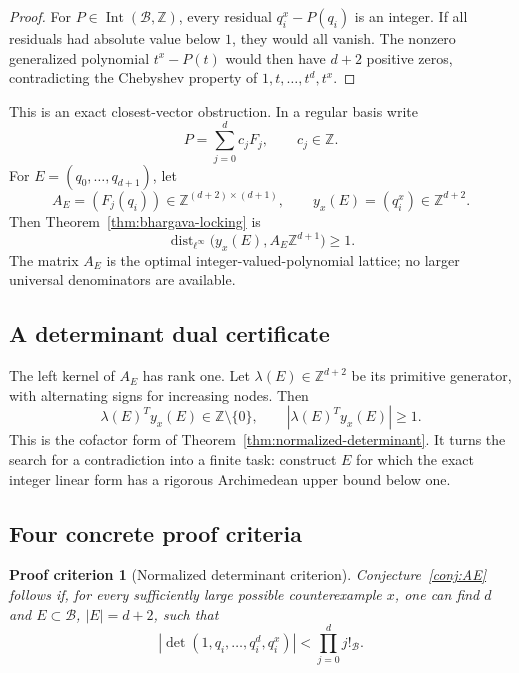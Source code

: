 \documentclass[11pt,oneside]{article}
\newtheorem{criterion}[theorem]{Proof criterion}
\theoremstyle{definition}
\theoremstyle{remark}
\newcommand{\Z}{\mathbb Z}
\newcommand{\B}{\mathcal B}
\newcommand{\Int}{\operatorname{Int}}
\newcommand{\dist}{\operatorname{dist}}
\begin{document}
\begin{proof}
For \(P\in\Int(\B,\Z)\), every residual \(q_i^x-P(q_i)\) is an integer.  If all residuals
had absolute value below \(1\), they would all vanish.  The nonzero generalized polynomial
\(t^x-P(t)\) would then have \(d+2\) positive zeros, contradicting the Chebyshev property of
\(1,t,\ldots,t^d,t^x\).
\end{proof}

This is an exact closest-vector obstruction.  In a regular basis write
\[
 P=\sum_{j=0}^{d}c_jF_j,\qquad c_j\in\Z.
\]
For \(E=(q_0,\ldots,q_{d+1})\), let
\[
 A_E=(F_j(q_i))\in\Z^{(d+2)\times(d+1)},
 \qquad
 y_x(E)=(q_i^x)\in\Z^{d+2}.
\]
Then Theorem~\ref{thm:bhargava-locking} is
\begin{equation}
 \dist_{\ell^\infty}\bigl(y_x(E),A_E\Z^{d+1}\bigr)\ge1.
 \label{eq:CVP}
\end{equation}
The matrix \(A_E\) is the optimal integer-valued-polynomial lattice; no larger universal
denominators are available.

\subsection{A determinant dual certificate}

The left kernel of \(A_E\) has rank one.  Let
\(\lambda(E)\in\Z^{d+2}\) be its primitive generator, with alternating signs for increasing
nodes.  Then
\begin{equation}
 \lambda(E)^{\!T}y_x(E)\in\Z\setminus\{0\},
 \qquad
 |\lambda(E)^{\!T}y_x(E)|\ge1.
 \label{eq:dual-certificate}
\end{equation}
This is the cofactor form of Theorem~\ref{thm:normalized-determinant}.  It turns the search for
a contradiction into a finite task: construct \(E\) for which the exact integer linear form
has a rigorous Archimedean upper bound below one.

\subsection{Four concrete proof criteria}

\begin{criterion}[Normalized determinant criterion]
\label{crit:det}
Conjecture~\ref{conj:AE} follows if, for every sufficiently large possible counterexample
\(x\), one can find \(d\) and \(E\subset\B\), \(|E|=d+2\), such that
\begin{equation}
 \left|
 \det(1,q_i,\ldots,q_i^d,q_i^x)
 \right|
 <
 \prod_{j=0}^{d}j!_{\B}.
 \label{eq:det-criterion}
\end{equation}
\end{criterion}
\end{document}
